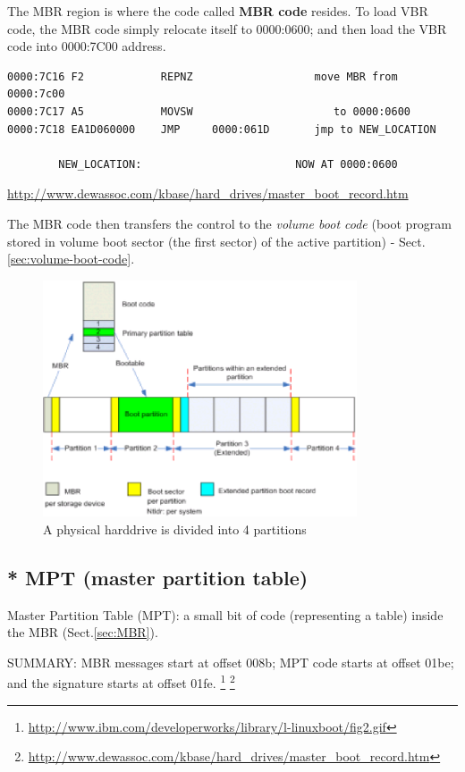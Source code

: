 The MBR region is where the code called {\bf MBR code} resides. To load VBR
code, the MBR code simply relocate itself to 0000:0600; and then load the VBR
code into 0000:7C00 address.
\begin{verbatim}
0000:7C16 F2            REPNZ                   move MBR from 0000:7c00
0000:7C17 A5            MOVSW                      to 0000:0600
0000:7C18 EA1D060000    JMP     0000:061D       jmp to NEW_LOCATION

        NEW_LOCATION:                        NOW AT 0000:0600
\end{verbatim}
\url{http://www.dewassoc.com/kbase/hard_drives/master_boot_record.htm}

The MBR code then transfers the control to the {\it volume boot code} (boot
program stored in volume boot sector (the first sector) of the active partition) -
Sect.\ref{sec:volume-boot-code}.


\begin{figure}[hbt]
 \centerline{\includegraphics[height=7cm]{./images/harddisk-MBR.eps}}
 \caption{A physical harddrive is divided into 4 partitions}
\label{fig:harddisk-MBR}
\end{figure}

\subsection{* MPT (master partition table)}
\label{sec:MPT}
\label{sec:master-partition-table}

Master Partition Table (MPT): a small bit of code (representing a table) inside
the MBR (Sect.\ref{sec:MBR}).


SUMMARY: MBR messages start at offset 008b; MPT code starts at offset 01be;
and the signature starts at offset 01fe.
\footnote{\url{http://www.ibm.com/developerworks/library/l-linuxboot/fig2.gif}}
\footnote{\url{http://www.dewassoc.com/kbase/hard_drives/master_boot_record.htm}}


